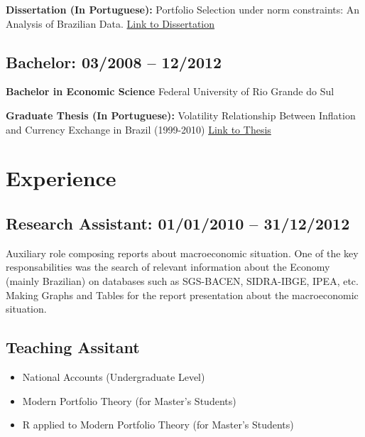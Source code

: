 \documentclass[10pt, a4paper]{article}
\newcommand{\ufrgs}{{Federal University of Rio Grande do Sul}}
\begin{document}
\textbf{Dissertation (In Portuguese):}
Portfolio Selection under norm constraints: An Analysis of Brazilian Data.
\href{http://www.lume.ufrgs.br/handle/10183/132904}{Link to Dissertation}

\vspace{-12pt}
\subsection{Bachelor: 03/2008 -- 12/2012}
\textbf{Bachelor in Economic Science}
\ufrgs{}


\textbf{Graduate Thesis (In Portuguese):}
Volatility Relationship Between Inflation and Currency Exchange in Brazil (1999-2010)
\href{http://www.lume.ufrgs.br/handle/10183/38307}{Link to Thesis}

\vspace{-6pt}
\section{Experience}

\subsection{Research Assistant: 01/01/2010 -- 31/12/2012}
Auxiliary role composing reports about macroeconomic situation.
One of the key responsabilities was the search of relevant information about the Economy (mainly Brazilian) on databases such as SGS-BACEN, SIDRA-IBGE, IPEA, etc.
Making Graphs and Tables for the report presentation about the macroeconomic situation.

\vspace{-12pt}

\subsection{Teaching Assitant}
\begin{itemize}[noitemsep]

\item
National Accounts (Undergraduate Level)

\item
Modern Portfolio Theory (for Master's Students)

\item
R applied to Modern Portfolio Theory (for Master's Students)
\end{itemize}
\end{document}
